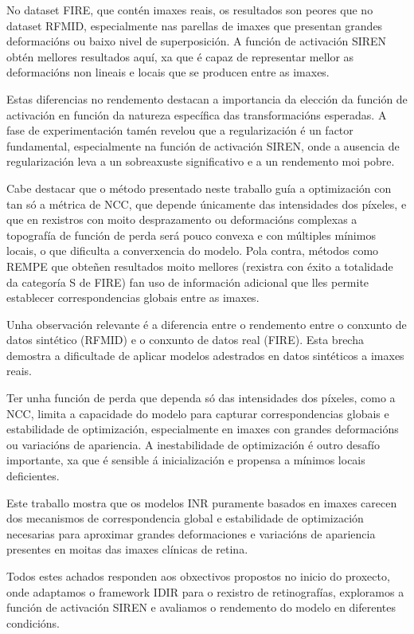No dataset FIRE, que contén imaxes reais, os resultados son peores que no dataset RFMID, especialmente nas parellas de imaxes que presentan grandes deformacións ou baixo nivel de superposición.
A función de activación SIREN obtén mellores resultados aquí, xa que é capaz de representar mellor as deformacións non lineais e locais que se producen entre as imaxes.

Estas diferencias no rendemento destacan a importancia da elección da función de activación en función da natureza específica das transformacións esperadas.
A fase de experimentación tamén revelou que a regularización é un factor fundamental, especialmente na función de activación SIREN, onde a ausencia de regularización leva a un sobreaxuste significativo e a un rendemento moi pobre.

Cabe destacar que o método presentado neste traballo guía a optimización con tan só a métrica de NCC, que depende únicamente das intensidades dos píxeles, e que en rexistros con moito desprazamento ou deformacións complexas a topografía de función de perda será pouco convexa e con múltiples mínimos locais, o que dificulta a converxencia do modelo.
Pola contra, métodos como REMPE \cite{rempe} que obteñen resultados moito mellores (rexistra con éxito a totalidade da categoría S de FIRE) fan uso de información adicional que lles permite establecer correspondencias globais entre as imaxes.

Unha observación relevante é a diferencia entre o rendemento entre o conxunto de datos sintético (RFMID) e o conxunto de datos real (FIRE). Esta brecha demostra a dificultade de aplicar modelos adestrados en datos sintéticos a imaxes reais.

Ter unha función de perda que dependa só das intensidades dos píxeles, como a NCC, limita a capacidade do modelo para capturar correspondencias globais e estabilidade de optimización, especialmente en imaxes con grandes deformacións ou variacións de apariencia.
A inestabilidade de optimización é outro desafío importante, xa que é sensible á inicialización e propensa a mínimos locais deficientes.

Este traballo mostra que os modelos \gls{INR} puramente basados en imaxes carecen dos mecanismos de correspondencia global e estabilidade de optimización necesarias para aproximar grandes deformaciones e variacións de apariencia presentes en moitas das imaxes clínicas de retina.

Todos estes achados responden aos obxectivos propostos no inicio do proxecto, onde adaptamos o framework IDIR para o rexistro de retinografías, exploramos a función de activación SIREN e avaliamos o rendemento do modelo en diferentes condicións.
